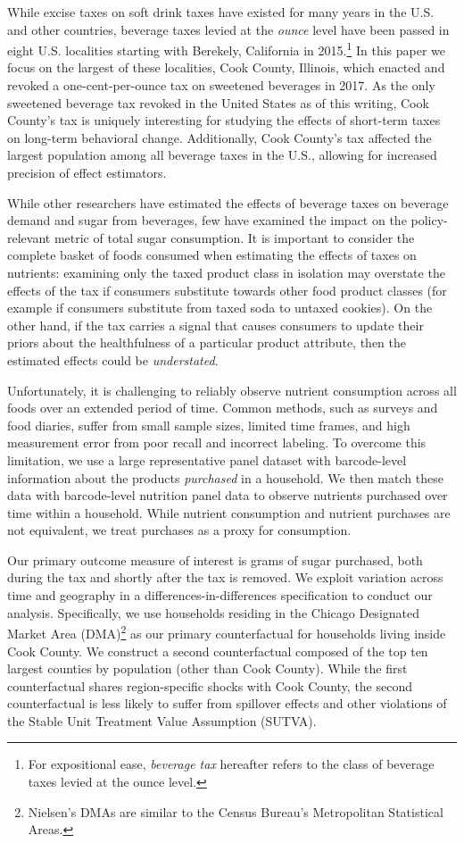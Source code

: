 \documentclass[12pt]{article}
\begin{document}
While excise taxes on soft drink taxes have existed for many years in the U.S. and other countries, beverage taxes levied at the \textit{ounce} level have been passed in eight U.S. localities starting with Berekely, California in 2015.\footnote{For expositional ease, \textit{beverage tax} hereafter refers to the class of beverage taxes levied at the ounce level.} In this paper we focus on the largest of these localities, Cook County, Illinois, which enacted and revoked a one-cent-per-ounce tax on sweetened beverages in 2017. As the only sweetened beverage tax revoked in the United States as of this writing, Cook County's tax is uniquely interesting for studying the effects of short-term taxes on long-term behavioral change. Additionally, Cook County's tax affected the largest population among all beverage taxes in the U.S., allowing for increased precision of effect estimators.

While other researchers have estimated the effects of beverage taxes on beverage demand and sugar from beverages, few have examined the impact on the policy-relevant metric of total sugar consumption. It is important to consider the complete basket of foods consumed when estimating the effects of taxes on nutrients: examining only the taxed product class in isolation may overstate the effects of the tax if consumers substitute towards other food product classes (for example if consumers substitute from taxed soda to untaxed cookies). On the other hand, if the tax carries a signal that causes consumers to update their priors about the healthfulness of a particular product attribute, then the estimated effects could be \textit{understated}.

Unfortunately, it is challenging to reliably observe nutrient consumption across all foods over an extended period of time. Common methods, such as surveys and food diaries, suffer from small sample sizes, limited time frames, and high measurement error from poor recall and incorrect labeling. To overcome this limitation, we use a large representative panel dataset with barcode-level information about the products \textit{purchased} in a household. We then match these data with barcode-level nutrition panel data to observe nutrients purchased over time within a household. While nutrient consumption and nutrient purchases are not equivalent, we treat purchases as a proxy for consumption.

Our primary outcome measure of interest is grams of sugar purchased, both during the tax and shortly after the tax is removed. We exploit variation across time and geography in a differences-in-differences specification to conduct our analysis. Specifically, we use households residing in the Chicago Designated Market Area (DMA)\footnote{Nielsen's DMAs are similar to the Census Bureau's Metropolitan Statistical Areas.} as our primary counterfactual for households living inside Cook County. We construct a second counterfactual composed of the top ten largest counties by population (other than Cook County). While the first counterfactual shares region-specific shocks with Cook County, the second counterfactual is less likely to suffer from spillover effects and other violations of the Stable Unit Treatment Value Assumption (SUTVA).
\end{document}
